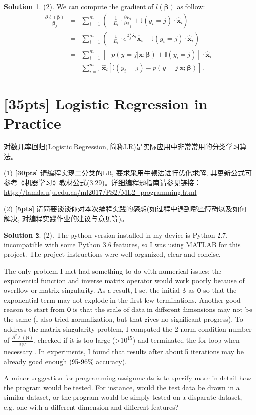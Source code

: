 \documentclass[a4paper,UTF8]{article}
\numberwithin{equation}{section}
\theoremstyle{definition}
\newtheorem*{solution}{Solution}
\begin{document}
\begin{solution}
\item[(2).] We can compute the gradient of ${l}(\bm{\beta})$ as follow:
\begin{eqnarray}
\frac{\partial{\ell}(\bm{\beta})}{\bm{\beta}_j}&=&\sum_{i=1}^m\left(-\frac{1}{E_i}\cdot\frac{\partial E_i}{\partial \bm{\beta}_j}+\mathbb{I}(y_i=j)\cdot\bm{\hat{x}}_i \right)\nonumber\\
&=&\sum_{i=1}^m\left(-\frac{1}{E_i}\cdot e^{\bm{\beta}_j^T\bm{\hat{x}}_i}\bm{\hat{x}}_i +\mathbb{I}(y_i=j)\cdot\bm{\hat{x}}_i \right)\nonumber\\
&=&\sum_{i=1}^m[-p(y=j|\bm{x};\bm{\beta}) +\mathbb{I}(y_i=j)]\cdot\bm{\hat{x}}_i \nonumber\\
&=&\sum_{i=1}^m\bm{\hat{x}}_i[\mathbb{I}(y_i=j)-p(y=j|\bm{x};\bm{\beta})].
\end{eqnarray}

\end{solution}

\section{[35pts] Logistic Regression in Practice} 
对数几率回归(Logistic Regression, 简称LR)是实际应用中非常常用的分类学习算法。

(1) \textbf{[30pts]} 请编程实现二分类的LR, 要求采用牛顿法进行优化求解, 其更新公式可参考《机器学习》教材公式(3.29)。详细编程题指南请参见链接：\url{http://lamda.nju.edu.cn/ml2017/PS2/ML2_programming.html}

(2) \textbf{[5pts]} 请简要谈谈你对本次编程实践的感想(如过程中遇到哪些障碍以及如何解决, 对编程实践作业的建议与意见等)。
\begin{solution}
\item[(2).] The python version installed in my device is Python 2.7, incompatible with some Python 3.6 features, so I was using MATLAB for this project. The project instructions were well-organized, clear and concise.

The only problem I met had something to do with numerical issues: the exponential function and inverse matrix operator would work poorly because of overflow or matrix singularity. As a result, I set the initial $\bm{\beta}$ as $\bm{0}$ so that the exponential term may not explode in the first few terminations. Another good reason to start from $\bm{0}$ is that the scale of data in different dimensions may not be the same (I also tried normalization, but that gives no significant progress). To address the matrix singularity problem, I computed the 2-norm condition number of $\frac{\partial^2\ell(\bm{\beta})}{\bm{\beta}\bm{\beta}^T}$, checked if it is too large (>$10^{15}$) and terminated the for loop when necessary \cite{ref: singular}. In experiments, I found that results after about 5 iterations may be already good enough (95-96\% accuracy).

A minor suggestion for programming assignments is to specify more in detail how the program would be tested. For instance, would the test data be drawn in a similar dataset, or the program would be simply tested on a disparate dataset, e.g. one with a different dimension and different features?

\end{solution}
\end{document}
